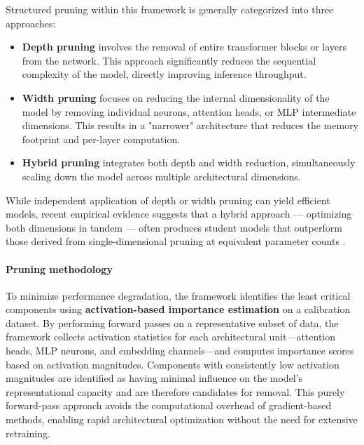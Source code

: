 \documentclass{article}
\begin{document}
Structured pruning within this framework is generally categorized into three approaches:
\begin{itemize}
    \item \textbf{Depth pruning} involves the removal of entire transformer blocks or layers from the network. This approach significantly reduces the sequential complexity of the model, directly improving inference throughput.
    \item \textbf{Width pruning} focuses on reducing the internal dimensionality of the model by removing individual neurons, attention heads, or MLP intermediate dimensions. This results in a "narrower" architecture that reduces the memory footprint and per-layer computation.
    \item \textbf{Hybrid pruning} integrates both depth and width reduction, simultaneously scaling down the model across multiple architectural dimensions.
\end{itemize}

While independent application of depth or width pruning can yield efficient models, recent empirical evidence suggests that a hybrid approach — optimizing both dimensions in tandem — often produces student models that outperform those derived from single-dimensional pruning at equivalent parameter counts \cite{muralidharan2024compact}.

\paragraph{Pruning methodology}
To minimize performance degradation, the framework \cite{nvidia_nemo} identifies the least critical components using \textbf{activation-based importance estimation} on a calibration dataset. By performing forward passes on a representative subset of data, the framework collects activation statistics for each architectural unit---attention heads, MLP neurons, and embedding channels---and computes importance scores based on activation magnitudes. Components with consistently low activation magnitudes are identified as having minimal influence on the model's representational capacity and are therefore candidates for removal. This purely forward-pass approach avoids the computational overhead of gradient-based methods, enabling rapid architectural optimization without the need for extensive retraining.
\end{document}
